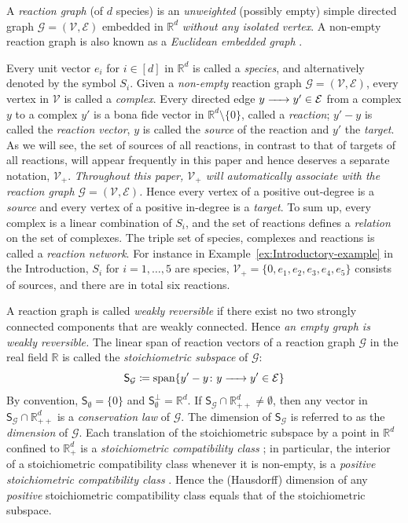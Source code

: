 \documentclass[10pt]{amsart}
\numberwithin{equation}{section}
\theoremstyle{plain}
\theoremstyle{definition}
\theoremstyle{remark}
\newcommand{\cE}{\mathcal{E}}
\newcommand{\cG}{\mathcal{G}}
\newcommand{\cV}{\mathcal{V}}
\begin{document}
A \emph{reaction graph} (of $d$ species) is an  \emph{unweighted} (possibly empty) simple directed graph $\cG=(\cV,\cE)$ embedded in $\mathbb{R}^d$ \emph{without any isolated vertex}. A non-empty reaction graph is also known as a \emph{Euclidean embedded graph} \cite{C19}.


Every unit vector $e_i$ for $i\in[d]$ in $\mathbb{R}^d$ is called a \emph{species}, and alternatively denoted by the symbol $S_i$. Given a \emph{non-empty} reaction graph $\cG=(\cV,\cE)$,  every vertex in $\cV$ is called a \emph{complex}.  Every directed edge $y\ce{->[]} y'\in\cE$ from a complex $y$ to a complex $y'$ is a bona fide vector in $\mathbb{R}^d\setminus\{0\}$, called a \emph{reaction};
$y'-y$ is called the \emph{reaction vector},
 $y$ is called the \emph{source} of the reaction and $y'$ the \emph{target}.
As we will see, the set of sources of all reactions, in contrast to that of targets of all reactions, will appear frequently in this paper and hence deserves a separate notation, $\cV_+$.  \emph{Throughout this paper, $\cV_+$  will automatically associate with the reaction graph $\cG=(\cV,\cE)$.}
 Hence every vertex of a positive out-degree is a \emph{source} and every vertex of a positive in-degree is a \emph{target}. To sum up, every complex is a linear combination of $S_i$, and the set of reactions defines a \emph{relation} on the set of complexes. The triple set of species, complexes and reactions is called a \emph{reaction network}. For instance in Example~\ref{ex:Introductory-example} in the Introduction,  $S_i$ for $i=1,\ldots,5$ are species, $\cV_+=\{0,e_1,e_2,e_3,e_4,e_5\}$
 consists of sources,
 and there are in total six reactions.


A reaction graph is called \emph{weakly reversible} if there exist no two strongly connected components that are weakly connected. Hence \emph{an empty graph is weakly reversible.} The linear span of reaction vectors of a reaction graph $\cG$ in the real field $\mathbb{R}$ is called the \emph{stoichiometric subspace} of $\cG$:
$$\mathsf{S}_{\cG}\coloneqq \text{span}\{y'-y\colon y\ce{->[]} y'\in\cE\}$$ By convention, $\mathsf{S}_{\emptyset}=\{0\}$ and $\mathsf{S}_{\emptyset}^{\perp}=\mathbb{R}^d$. If $\mathsf{S}_{\cG}\cap\mathbb{R}^d_{++}\neq\emptyset$, then any vector in $\mathsf{S}_{\cG}\cap\mathbb{R}^d_{++}$ is a \emph{conservation law} of $\cG$. The dimension of $\mathsf{S}_{\cG}$ is referred to as the \emph{dimension} of $\cG$. Each  translation of the stoichiometric subspace by a point in $\mathbb{R}^d$ confined to $\mathbb{R}^d_+$ is a \emph{stoichiometric compatibility class} \cite{F87}; in particular, the interior of a stoichiometric compatibility class whenever it is non-empty, is a \emph{positive stoichiometric compatibility class} \cite{F87}. Hence the (Hausdorff) dimension of any \emph{positive}  stoichiometric compatibility class equals that of the stoichiometric subspace.
\end{document}

